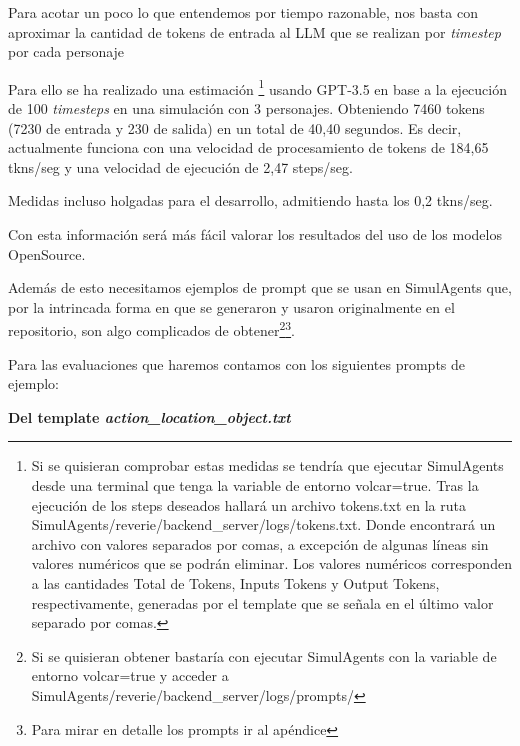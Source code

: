 Para acotar un poco lo que entendemos por tiempo razonable, nos basta con aproximar la cantidad de tokens de entrada al LLM que se realizan por \textit{timestep} por cada personaje

Para ello se ha realizado una estimación \footnote{Si se quisieran comprobar estas medidas se tendría que ejecutar SimulAgents desde una terminal que tenga la variable de entorno volcar=true. Tras la ejecución de los steps deseados hallará un archivo tokens.txt en la ruta SimulAgents/reverie/backend\_server/logs/tokens.txt. Donde encontrará un archivo con valores separados por comas, a excepción de algunas líneas sin valores numéricos que se podrán eliminar. Los valores numéricos corresponden a las cantidades Total de Tokens, Inputs Tokens y Output Tokens, respectivamente, generadas por el template que se señala en el último valor separado por comas.} usando GPT-3.5 en base a la ejecución de 100 \textit{timesteps} en una simulación con 3 personajes. Obteniendo 7460 tokens (7230 de entrada y 230 de salida) en un total de 40,40 segundos. Es decir, actualmente funciona con una velocidad de procesamiento de tokens de 184,65 tkns/seg y una velocidad de ejecución de 2,47 steps/seg.

Medidas incluso holgadas para el desarrollo, admitiendo hasta los 0,2 tkns/seg.

Con esta información será más fácil valorar los resultados del uso de los modelos OpenSource.

Además de esto necesitamos ejemplos de prompt que se usan en SimulAgents que, por la intrincada forma en que se generaron y usaron originalmente en el repositorio, son algo complicados de obtener\footnote{Si se quisieran obtener bastaría con ejecutar SimulAgents con la variable de entorno volcar=true y acceder a SimulAgents/reverie/backend\_server/logs/prompts/}\footnote{Para mirar en detalle los prompts ir al apéndice}.

Para las evaluaciones que haremos contamos con los siguientes prompts de ejemplo:

\newcommand{\gentxt}[1]{{\color{darkgray}\scriptsize\fontfamily{}\selectfont#1}}


\textbf{Del template \textit{action\_location\_object.txt}}

